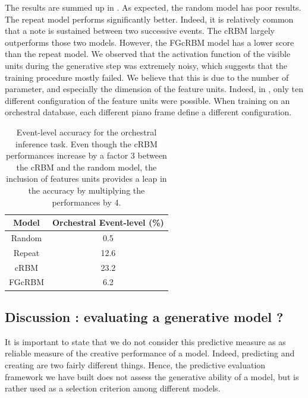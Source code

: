 \documentclass[letterpaper]{article}
\begin{document}
The results are summed up in . As expected, the random model has poor results. The repeat model performs significantly better. Indeed, it is relatively common that a note is sustained between two successive events. The cRBM largely outperforms those two models. However, the FGcRBM model has a lower score than the repeat model. We observed that the activation function of the visible units during the generative step was extremely noisy, which suggests that the training procedure mostly failed. We believe that this is due to the number of parameter,  and especially the dimension of the feature units. Indeed, in \cite{taylor2009factored}, only ten different configuration of the feature units were possible. When training on an orchestral database,  each different piano frame define a different configuration.

\begin{table}[h]
\centering
\begin{tabular}{c c}
\hline
Model & Orchestral Event-level (\%)\\
\hline
Random & 0.5\\ 
Repeat & 12.6\\
\hline \hline
cRBM & 23.2\\ 
FGcRBM & 6.2\\ 
\end{tabular}
\caption{Event-level accuracy for the orchestral inference task. Even though the cRBM performances increase by a factor 3 between the cRBM and the random model, the inclusion of features units provides a leap in the accuracy by multiplying the performances by 4.}
\label{tab:result_event_level}
\end{table}

\subsection{Discussion : evaluating a generative model ?}
It is important to state that we do not consider this predictive measure as as reliable measure of the creative performance of a model. Indeed, predicting and creating are two fairly different things. 
Hence, the predictive evaluation framework we have built does not assess the generative ability of a model, but is rather used as a selection criterion among different models.

\end{document}
